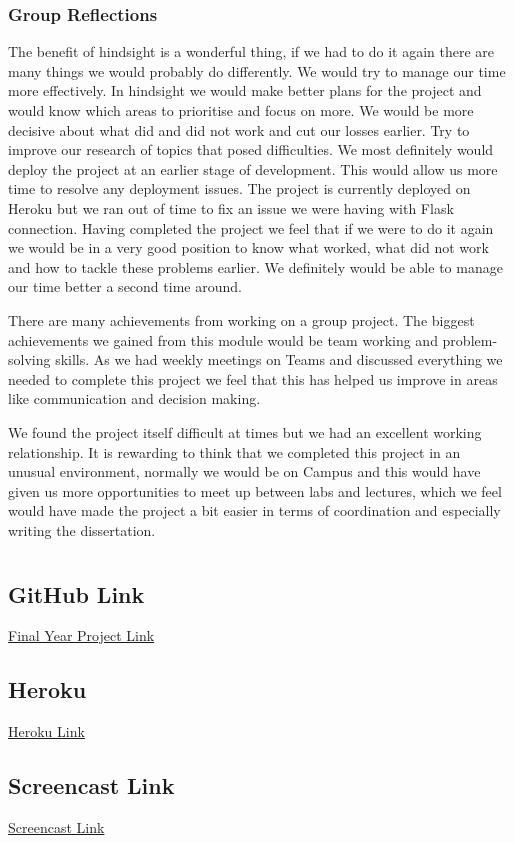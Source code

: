 \subsection{Group Reflections}
The benefit of hindsight is a wonderful thing, if we had to do it again there are many things we would probably do differently.
We would try to manage our time more effectively. In hindsight we would make better plans for the project and would know which areas to prioritise and focus on more. We would be more decisive about what did and did not work and cut our losses earlier. Try to improve our research of topics that posed difficulties.
We most definitely would deploy the project at an earlier stage of development. This would allow us more time to resolve any deployment issues. The project is currently deployed on Heroku but we ran out of time to fix an issue we were having with Flask connection. Having completed the project we feel that if we were to do it again we would be in a very good position to know what worked, what did not work and how to tackle these problems earlier. We definitely would be able to manage our time better a second time around.\\
\vspace{5mm}

There are many achievements from working on a group project. The biggest achievements we gained from this module would be team working and problem-solving skills. As we had weekly meetings on Teams and discussed everything we needed to complete this project we feel that this has helped us improve in areas like communication and decision making.\\
\vspace{5mm}

We found the project itself difficult at times but we had an excellent working relationship. It is rewarding to think that we completed this project in an unusual environment, normally we would be on Campus and this would have given us more opportunities to meet up between labs and lectures, which we feel would have made the project a bit easier in terms of coordination and especially writing the dissertation.






\appendix 
\chapter{}
\section{GitHub Link}
\href{https://github.com/4th-year-project-2020-2021/Final-Year-Project-Data-Visualization}{Final Year Project Link}
\section{Heroku}
\href{https://final-year-project-data-visual.herokuapp.com/}{Heroku Link}
\section{Screencast Link}
\href{}{Screencast Link}

